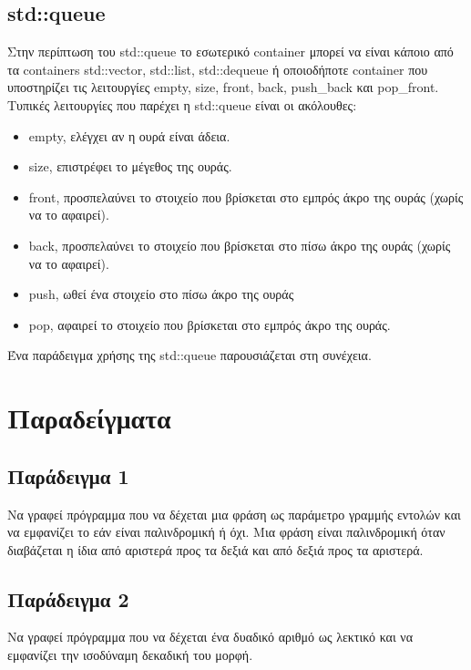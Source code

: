 \subsection{std::queue}
Στην περίπτωση του std::queue το εσωτερικό container μπορεί να είναι κάποιο από τα containers std::vector, std::list, std::dequeue ή οποιοδήποτε container που υποστηρίζει τις λειτουργίες empty, size, front, back, push\_back και pop\_front. Τυπικές λειτουργίες που παρέχει η std::queue είναι οι ακόλουθες:
\begin{itemize}[noitemsep]
\item empty, ελέγχει αν η ουρά είναι άδεια.
\item size, επιστρέφει το μέγεθος της ουράς.
\item front, προσπελαύνει το στοιχείο που βρίσκεται στο εμπρός άκρο της ουράς (χωρίς να το αφαιρεί).
\item back, προσπελαύνει το στοιχείο που βρίσκεται στο πίσω άκρο της ουράς (χωρίς να το αφαιρεί).
\item push, ωθεί ένα στοιχείο στο πίσω άκρο της ουράς
\item pop, αφαιρεί το στοιχείο που βρίσκεται στο εμπρός άκρο της ουράς.
\end{itemize}

Ένα παράδειγμα χρήσης της std::queue παρουσιάζεται στη συνέχεια.




\section{Παραδείγματα}
\subsection{Παράδειγμα 1}
Να γραφεί πρόγραμμα που να δέχεται μια φράση ως παράμετρο γραμμής εντολών και να εμφανίζει το εάν είναι παλινδρομική ή όχι. Μια φράση είναι παλινδρομική όταν διαβάζεται η ίδια από αριστερά προς τα δεξιά και από δεξιά προς τα αριστερά.




\subsection{Παράδειγμα 2}
Να γραφεί πρόγραμμα που να δέχεται ένα δυαδικό αριθμό ως λεκτικό και να εμφανίζει την ισοδύναμη δεκαδική του μορφή.


